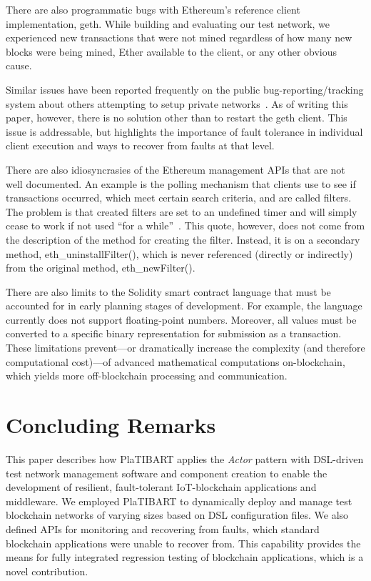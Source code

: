 There are also programmatic bugs with Ethereum's reference client implementation, geth. While building and evaluating our test network, we experienced new transactions that were not mined regardless of how many new blocks were being mined, Ether available to the client, or any other obvious cause. 

Similar issues have been reported frequently on the public bug-reporting/tracking system about others attempting to setup private networks~\cite{EthereumIssue14893:online}. As of writing this paper, however, there is no solution other than to restart the geth client. This issue is addressable, but highlights the importance of fault tolerance in individual client execution and ways to recover from faults at that level. 

There are also idiosyncrasies of the Ethereum management APIs that are not well documented. An example is the polling mechanism that clients use to see if transactions occurred, which meet certain search criteria, and are called filters. The problem is that created filters are set to an undefined timer and will simply cease to work if not used ``for a while''~\cite{EthereumJSONRPC}. This quote, however, does not come from the description of the method for creating the filter. Instead, it is on a secondary method, eth\_uninstallFilter(), which is never referenced (directly or indirectly) from the original method, eth\_newFilter(). 

There are also limits to the Solidity smart contract language that must be accounted for in early planning stages of development. For example, the language currently does not support floating-point numbers. Moreover, all values must be converted to a specific binary representation for submission as a transaction. These limitations prevent---or dramatically increase the complexity (and therefore computational cost)---of advanced mathematical computations on-blockchain, which yields more off-blockchain processing and communication.

 
\section{Concluding Remarks}
\label{conclusion}
This paper describes how PlaTIBART applies the \textit{Actor} pattern with DSL-driven test network management software and component creation to enable the development of resilient, fault-tolerant IoT-blockchain applications and middleware. We employed PlaTIBART to dynamically deploy and manage test blockchain networks of varying sizes based on DSL configuration files. We also defined APIs for monitoring and recovering from faults, which standard blockchain applications were unable to recover from. This capability provides the means for fully integrated regression testing of blockchain applications, which is a novel contribution.

